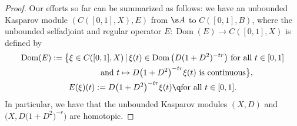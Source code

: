 \begin{proof}
Our efforts so far can be summarized as follows: we have an unbounded Kasparov module $( C([0,1],X), E)$ from $\s A$ to $C([0,1],B)$, where the unbounded selfadjoint and regular operator $E\colon \operatorname{Dom}(E) \to C( [0,1],X)$ is defined by
\begin{gather*}
\operatorname{Dom}(E) := \big\{ \xi \in C( [0,1],X) \,|\, \xi(t) \in \operatorname{Dom}\big( D(1 + D^2)^{-tr}\big) \ \text{for all} \ t \in [0,1] \\
\hphantom{\operatorname{Dom}(E) :=\big\{}{} \text{and} \ t \mapsto D\big(1 + D^2\big)^{-tr} \xi(t) \ \text{is continuous} \big\}, \\
E(\xi)(t) := D\big(1 + D^2\big)^{-tr} \xi(t) \q \text{for all } t \in [0,1] .
\end{gather*}
In particular, we have that the unbounded Kasparov modules $(X,D)$ and $\big(X, D\big(1 + D^2\big)^{-r}\big)$ are homotopic.


\end{proof}
